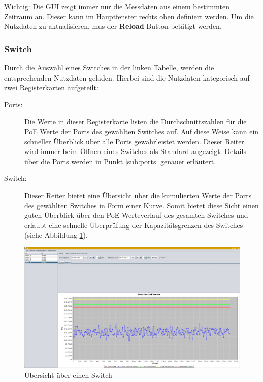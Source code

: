 Wichtig: Die GUI zeigt immer nur die Messdaten aus einem bestimmten Zeitraum an. Dieser kann im Hauptfenster rechts oben definiert werden. Um die Nutzdaten zu aktualisieren, mus der \textbf{Reload} Button betätigt werden.

\subsubsection{Switch}
Durch die Auswahl eines Switches in der linken Tabelle, werden die entsprechenden Nutzdaten geladen. Hierbei sind die Nutzdaten kategorisch auf zwei Registerkarten aufgeteilt:
\begin{description}
 \item[Ports:] Die Werte in dieser Registerkarte listen die Durchschnittszahlen für die PoE Werte der Ports des gewählten Switches auf. Auf diese Weise kann ein schneller Überblick über alle Ports gewährleistet werden. Dieser Reiter wird immer beim Öffnen eines Switches als Standard angezeigt. Details über die Ports werden in Punkt \ref{sub:ports} genauer erläutert.
 \item[Switch:] Dieser Reiter bietet eine Übersicht über die kumulierten Werte der Ports des gewählten Switches in Form einer Kurve. Somit bietet diese Sicht einen guten Überblick über den PoE Werteverlauf des gesamten Switches und erlaubt eine schnelle Überprüfung der Kapazitätsgrenzen des Switches (siehe Abbildung \ref{fig:overview-switch}).
\end{description}

\begin{figure}[h]
    \centering
    \leavevmode
    \includegraphics[width=1.0\linewidth]{figures/screenshot2}
    \caption{Übersicht über einen Switch}
    \label{fig:overview-switch}
\end{figure}

